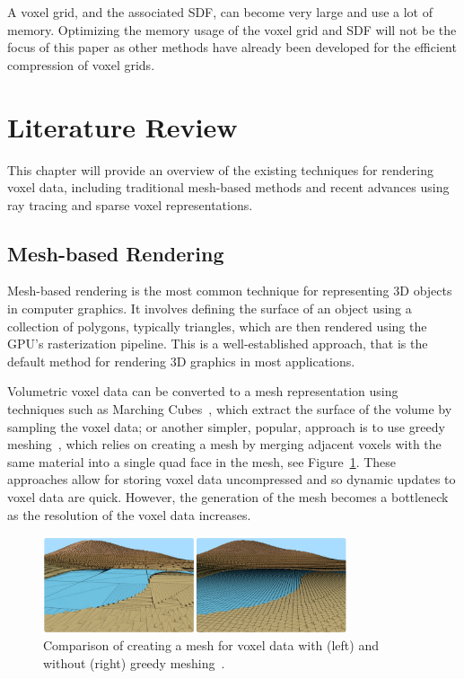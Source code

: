 \documentclass{article}
\begin{document}
A voxel grid, and the associated SDF, can become very large and use a lot of memory. Optimizing the memory usage of the voxel grid and SDF will not be the focus of this paper as other methods have already been developed for the efficient compression of voxel grids.

\section{Literature Review}
This chapter will provide an overview of the existing techniques for rendering voxel data, including traditional mesh-based methods and recent advances using ray tracing and sparse voxel representations.

\subsection{Mesh-based Rendering}
Mesh-based rendering is the most common technique for representing 3D objects in computer graphics. It involves defining the surface of an object using a collection of polygons, typically triangles, which are then rendered using the GPU's rasterization pipeline. This is a well-established approach, that is the default method for rendering 3D graphics in most applications.

Volumetric voxel data can be converted to a mesh representation using techniques such as Marching Cubes~\cite{Amran_1998}, which extract the surface of the volume by sampling the voxel data; or another simpler, popular, approach is to use greedy meshing~\cite{mikolalysenko_2012}, which relies on creating a mesh by merging adjacent voxels with the same material into a single quad face in the mesh, see Figure~\ref{fig:greedy}. These approaches allow for storing voxel data uncompressed and so dynamic updates to voxel data are quick. However, the generation of the mesh becomes a bottleneck as the resolution of the voxel data increases.

\begin{figure}[thp]
    \begin{center}
        \includegraphics[width=0.8\textwidth]{figures/greedy.png}
    \end{center}
    \caption{Comparison of creating a mesh for voxel data with (left) and without (right) greedy meshing~\cite{Gedge_2014}.}
    \label{fig:greedy}
\end{figure}
\end{document}
